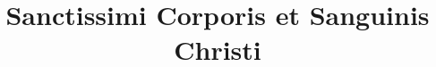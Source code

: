 \documentclass[17pt]{extarticle}
\begin{document}
\title{Sanctissimi Corporis et Sanguinis Christi}
\makereadingtitle

\end{document}
